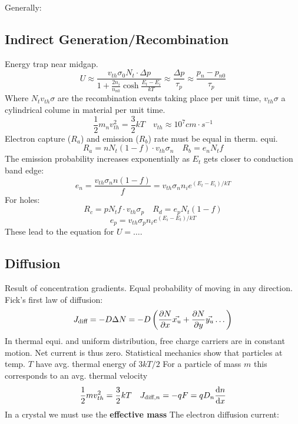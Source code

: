 \documentclass[a4paper, fontsize=8pt, landscape, DIV=1]{scrartcl}
\begin{document}
\begin{multicols*}{4}
    Generally:

  \subsection{Indirect Generation/Recombination}
    Energy trap near midgap.
    \[ U \approx  \frac{v_{th}\sigma_0N_t\cdot\Delta p}{1 + \frac{2n_i}{n_{n0}}\cosh\frac{E_t - E_i}{kT}} \approx \frac{\Delta p}{\tau_p} \approx \frac{p_n - p_{n0}}{\tau_p}\]
    Where $N_tv_{th}\sigma$ are the recombination events taking place per unit time, $v_{th}\sigma$ a cylindrical colume in material per unit time.
    \[\frac{1}{2}m_nv_{th}^2=\frac{3}{2}kT \quad v_{th}\approx 10^7 cm\cdot s^{-1}\]
    Electron capture ($R_a$) and emission ($R_b$) rate must be equal in therm. equi.
    \[R_a = nN_t(1-f)\cdot v_{th}\sigma_n \quad R_b = e_nN_tf\]
    The emission probability increases exponentially as $E_t$ gets closer to conduction band edge:
    \[e_n = \frac{v_{th}\sigma_nn(1-f)}{f}=v_{th}\sigma_nn_ie^{(E_t-E_i)/kT}\]
    For holes:
    \[R_c = pN_tf\cdot v_{th}\sigma_p \quad R_d = e_pN_t(1-f)\]
    \[e_p = v_{th}\sigma_p n_i e^{(E_i-E_t)/kT}\]
    These lead to the equation for $U=\dots$.

  \subsection{Diffusion}
    \ifdefined\makeultracompact\else
      Result of concentration gradients.
      Equal probability of moving in any direction.
      Fick's first law of diffusion:
    \fi
    \[J_{\text{diff}} = -D\Delta N = -D \left( \frac{\partial N}{\partial x}\vec{x_u} + \frac{\partial N}{\partial y}\vec{y_u} \dots \right)\]
    \ifdefined\makeultracompact\else
      In thermal equi. and uniform distribution, free charge carriers are in constant motion. 
      Net current is thus zero.
      Statistical mechanics show that particles at temp. $T$ have avg. thermal energy of $3kT/2$
      For a particle of mass $m$ this corresponds to an avg. thermal velocity
    \fi
    \[\frac{1}{2}mv_{th}^2=\frac{3}{2}kT \quad J_{\text{diff},n} = -qF = qD_n\frac{\mathrm{d}n}{\mathrm{d}x}\]
    \ifdefined\makeultracompact\else
      In a crystal we must use the \textbf{effective mass}
      The electron diffusion current:
    \fi


\end{multicols*}
\end{document}

